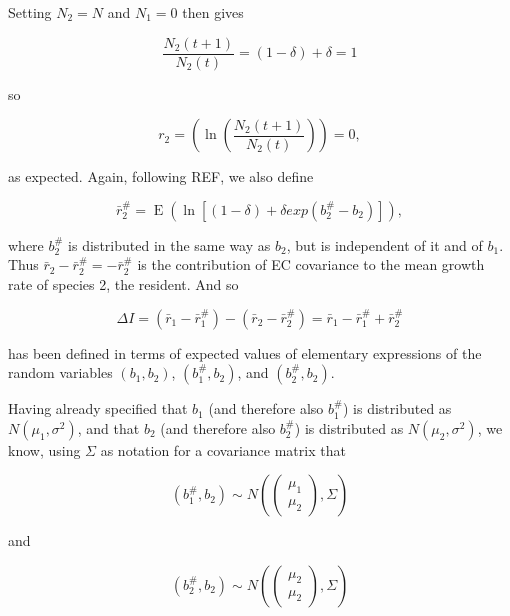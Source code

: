 \documentclass[letterpaper,11pt]{article}
\DeclareMathOperator{\EX}{E}%
\begin{document}
\noindent Setting $N_2=N$ and $N_1=0$ then gives

\begin{equation}
\frac{N_2(t+1)}{N_2(t)}=(1-\delta)+\delta=1  \label{sp2_Nt+1_over_Nt_simp}
\end{equation}

\noindent so

\begin{equation}
r_2=(\ln (\frac{N_2(t+1)}{N_2(t)}))=0, \label{r2_is_zero}
\end{equation}

\noindent as expected. Again, following REF, we also define

\begin{equation}
\bar r_2^\#=\EX(\ln [(1-\delta)+\delta exp(b_2^\#-b_2)]),  \label{rbar2sharp_E}
\end{equation}

\noindent where $b_2^\#$ is distributed in the same way as $b_2$, but is independent of it and of $b_1$. Thus $\bar r_2- \bar r_2^\# = -\bar r_2^\#$ is the contribution of EC covariance to the mean growth rate of species 2, the resident. And so

\begin{equation}
\Delta I=(\bar r_1 - \bar r_1^\#)-(\bar r_2- \bar r_2^\#)=\bar r_1 - \bar r_1^\#+\bar r_2^\#  \label{DeltaI}
\end{equation}

\noindent has been defined in terms of expected values of elementary expressions of the random variables $(b_1,b_2)$, $(b_1^\#,b_2)$, and $(b_2^\#, b_2)$.

Having already specified that $b_1$ (and therefore also $b_1^\#$) is distributed as $N(\mu_1, \sigma^2)$, and that $b_2$ (and therefore also $b_2^\#$) is distributed as $N(\mu_2, \sigma^2)$, we know, using $\Sigma$ as notation for a covariance matrix that

\begin{equation}
(b_1^\#, b_2) \sim N(\begin{pmatrix} \mu_1\\\mu_2\end{pmatrix}, \Sigma) \label{b1sharpb2_distribution}
\end{equation}

\noindent and 

\begin{equation}
(b_2^\#, b_2) \sim N(\begin{pmatrix} \mu_2\\\mu_2\end{pmatrix}, \Sigma) \label{b2sharpb2_distribution}
\end{equation}
\end{document}
